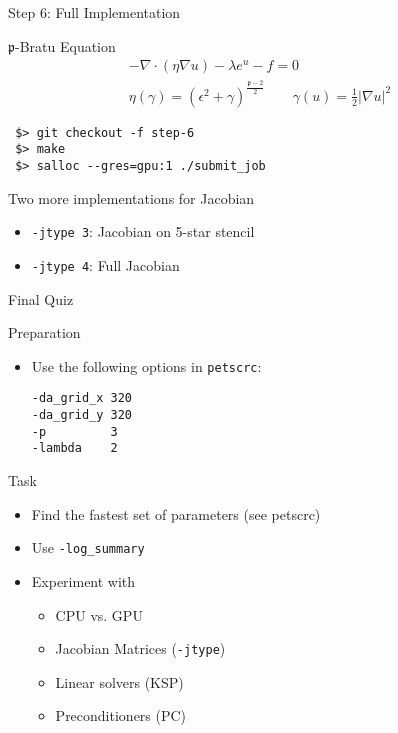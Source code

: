 


\begin{frame}[fragile]{Step 6: Full Implementation}

  \begin{block}{$\mathfrak{p}$-Bratu Equation}
    \begin{gather*}
      -\nabla \cdot (\eta \nabla u) - \lambda e^u - f = 0 \\
      \eta(\gamma) = (\epsilon^2 + \gamma)^{\frac{\mathfrak{p}-2}{2}} \qquad \gamma(u) = \frac{1}{2} \vert\nabla u\vert^2
    \end{gather*}

 \begin{lstlisting}
 $> git checkout -f step-6
 $> make
 $> salloc --gres=gpu:1 ./submit_job
 \end{lstlisting}
  \end{block}

  \begin{block}{Two more implementations for Jacobian}
    \begin{itemize}
     \item \lstinline|-jtype 3|: Jacobian on 5-star stencil
     \item \lstinline|-jtype 4|: Full Jacobian
    \end{itemize}

  \end{block}

\end{frame}


\begin{frame}[fragile]{Final Quiz}

  \begin{block}{Preparation}
    \begin{itemize}
     \item Use the following options in \lstinline|petscrc|:
 \begin{lstlisting}
-da_grid_x 320 
-da_grid_y 320
-p         3
-lambda    2
 \end{lstlisting}
    \end{itemize}
  \end{block}

  \begin{block}{Task}
    \begin{itemize}
     \item Find the fastest set of parameters (see petscrc)
     \item Use \lstinline|-log_summary|
     \item Experiment with
     \begin{itemize}
      \item CPU vs. GPU
      \item Jacobian Matrices (\lstinline|-jtype|)
      \item Linear solvers (KSP)
      \item Preconditioners (PC)
     \end{itemize}
    \end{itemize}
  \end{block}

\end{frame}



